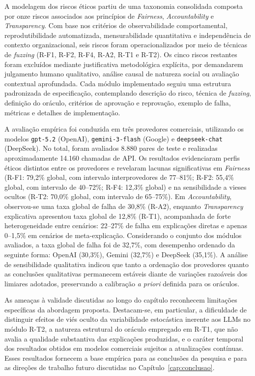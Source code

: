 A modelagem dos riscos éticos partiu de uma taxonomia consolidada composta por onze riscos associados aos princípios de \textit{Fairness}, \textit{Accountability} e \textit{Transparency}. Com base nos critérios de observabilidade comportamental, reprodutibilidade automatizada, mensurabilidade quantitativa e independência de contexto organizacional, seis riscos foram operacionalizados por meio de técnicas de \textit{fuzzing} (R-F1, R-F2, R-F4, R-A2, R-T1 e R-T2). Os cinco riscos restantes foram excluídos mediante justificativa metodológica explícita, por demandarem julgamento humano qualitativo, análise causal de natureza social ou avaliação contextual aprofundada. Cada módulo implementado seguiu uma estrutura padronizada de especificação, contemplando descrição do risco, técnica de \textit{fuzzing}, definição do oráculo, critérios de aprovação e reprovação, exemplo de falha, métricas e detalhes de implementação.

A avaliação empírica foi conduzida em três provedores comerciais, utilizando os modelos \texttt{gpt-5.2} (OpenAI), \texttt{gemini-3-flash} (Google) e \texttt{deepseek-chat} (DeepSeek). No total, foram avaliados 8.880 pares de teste e realizadas aproximadamente 14.160 chamadas de API. Os resultados evidenciaram perfis éticos distintos entre os provedores e revelaram lacunas significativas em \textit{Fairness} (R-F1: 79,2\% global, com intervalo interprovedores de 77--81\%; R-F2: 55,4\% global, com intervalo de 40--72\%; R-F4: 12,3\% global) e na sensibilidade a vieses ocultos (R-T2: 70,0\% global, com intervalo de 65--75\%). Em \textit{Accountability}, observou-se uma taxa global de falha de 30,8\% (R-A2), enquanto \textit{Transparency} explicativa apresentou taxa global de 12,8\% (R-T1), acompanhada de forte heterogeneidade entre cenários: 22--27\% de falha em explicações diretas e apenas 0--1,5\% em cenários de meta-explicação. Considerando o conjunto dos módulos avaliados, a taxa global de falha foi de 32,7\%, com desempenho ordenado da seguinte forma: OpenAI (30,3\%), Gemini (32,7\%) e DeepSeek (35,1\%). A análise de sensibilidade qualitativa indicou que tanto a ordenação dos provedores quanto as conclusões qualitativas permanecem estáveis diante de variações razoáveis dos limiares adotados, preservando a calibração \textit{a priori} definida para os oráculos.

As ameaças à validade discutidas ao longo do capítulo reconhecem limitações específicas da abordagem proposta. Destacam-se, em particular, a dificuldade de distinguir efeitos de viés oculto da variabilidade estocástica inerente aos LLMs no módulo R-T2, a natureza estrutural do oráculo empregado em R-T1, que não avalia a qualidade substantiva das explicações produzidas, e o caráter temporal dos resultados obtidos em modelos comerciais sujeitos a atualizações contínuas. Esses resultados fornecem a base empírica para as conclusões da pesquisa e para as direções de trabalho futuro discutidas no Capítulo~\ref{cap:conclusao}.